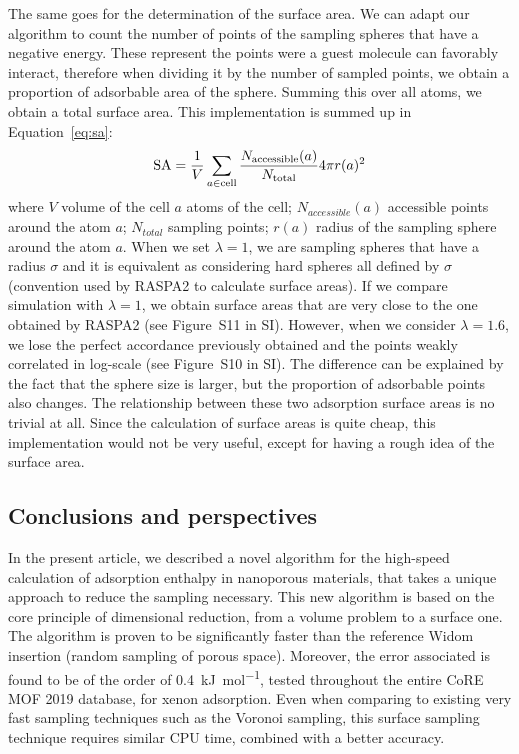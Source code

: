 \documentclass[main]{subfiles}
\begin{document}
The same goes for the determination of the surface area. We can adapt our algorithm to count the number of points of the sampling spheres that have a negative energy. These represent the points were a guest molecule can favorably interact, therefore when dividing it by the number of sampled points, we obtain a proportion of adsorbable area of the sphere. Summing this over all atoms, we obtain a total surface area. This implementation is summed up in Equation~\ref{eq:sa}:
\begin{equation}
\label{eq:sa}
    \textrm{SA} = \dfrac{1}{V}\sum_{a\in \textrm{cell}} \dfrac{N_{\text{accessible}}(a)}{N_{\text{total}}}4\pi r(a)^2
\end{equation}
where $V$ volume of the cell $a$ atoms of the cell; $N_{accessible}(a)$ accessible points around the atom $a$; $N_{total}$ sampling points; $r(a)$ radius of the sampling sphere around the atom $a$.
When we set $\lambda=1$, we are sampling spheres that have a radius $\sigma$ and it is equivalent as considering hard spheres all defined by $\sigma$ (convention used by RASPA2 to calculate surface areas). If we compare simulation with $\lambda=1$, we obtain surface areas that are very close to the one obtained by RASPA2 (see Figure~S11 in SI). However, when we consider $\lambda=1.6$, we lose the perfect accordance previously obtained and the points weakly correlated in log-scale (see Figure~S10 in SI). The difference can be explained by the fact that the sphere size is larger, but the proportion of adsorbable points also changes. The relationship between these two adsorption surface areas is no trivial at all. Since the calculation of surface areas is quite cheap, this implementation would not be very useful, except for having a rough idea of the surface area.



\subsection{Conclusions and perspectives}

In the present article, we described a novel algorithm for the high-speed calculation of adsorption enthalpy in nanoporous materials, that takes a unique approach to reduce the sampling necessary. This new algorithm is based on the core principle of dimensional reduction, from a volume problem to a surface one. The algorithm is proven to be significantly faster than the reference Widom insertion (random sampling of porous space). Moreover, the error associated is found to be of the order of \SI{0.4}{\kilo\joule\per\mole}, tested throughout the entire CoRE MOF 2019 database, for xenon adsorption. Even when comparing to existing very fast sampling techniques such as the Voronoi sampling, this surface sampling technique requires similar CPU time, combined with a better accuracy. 
\end{document}
